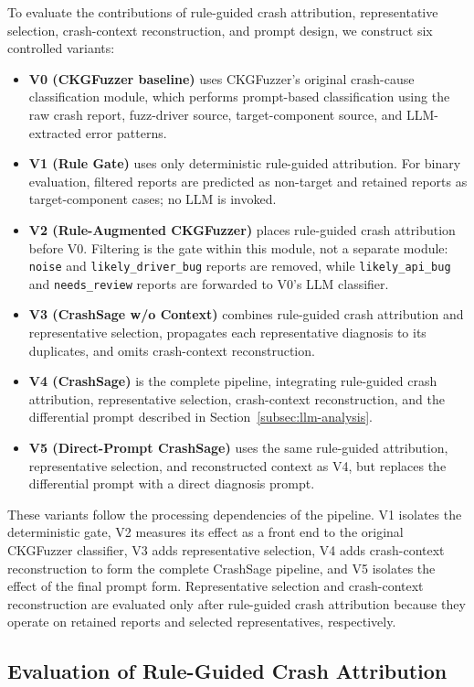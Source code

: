 \documentclass[pdflatex,sn-basic]{sn-jnl}%
\theoremstyle{thmstyleone}%
\theoremstyle{thmstyletwo}%
\theoremstyle{thmstylethree}%
\begin{document}
To evaluate the contributions of rule-guided crash attribution, representative selection, crash-context reconstruction, and prompt design, we construct six controlled variants:
\begin{itemize}
    \item \textbf{V0 (CKGFuzzer baseline)} uses CKGFuzzer's original crash-cause classification module, which performs prompt-based classification using the raw crash report, fuzz-driver source, target-component source, and LLM-extracted error patterns.
    \item \textbf{V1 (Rule Gate)} uses only deterministic rule-guided attribution. For binary evaluation, filtered reports are predicted as non-target and retained reports as target-component cases; no LLM is invoked.
    \item \textbf{V2 (Rule-Augmented CKGFuzzer)} places rule-guided crash attribution before V0. Filtering is the gate within this module, not a separate module: \texttt{noise} and \texttt{likely\_driver\_bug} reports are removed, while \texttt{likely\_api\_bug} and \texttt{needs\_review} reports are forwarded to V0's LLM classifier.
    \item \textbf{V3 (CrashSage w/o Context)} combines rule-guided crash attribution and representative selection, propagates each representative diagnosis to its duplicates, and omits crash-context reconstruction.
    \item \textbf{V4 (CrashSage)} is the complete pipeline, integrating rule-guided crash attribution, representative selection, crash-context reconstruction, and the differential prompt described in Section~\ref{subsec:llm-analysis}.
    \item \textbf{V5 (Direct-Prompt CrashSage)} uses the same rule-guided attribution, representative selection, and reconstructed context as V4, but replaces the differential prompt with a direct diagnosis prompt.
\end{itemize}
These variants follow the processing dependencies of the pipeline. V1 isolates the deterministic gate, V2 measures its effect as a front end to the original CKGFuzzer classifier, V3 adds representative selection, V4 adds crash-context reconstruction to form the complete CrashSage pipeline, and V5 isolates the effect of the final prompt form. Representative selection and crash-context reconstruction are evaluated only after rule-guided crash attribution because they operate on retained reports and selected representatives, respectively.

\FloatBarrier
\subsection{Evaluation of Rule-Guided Crash Attribution}
\end{document}
